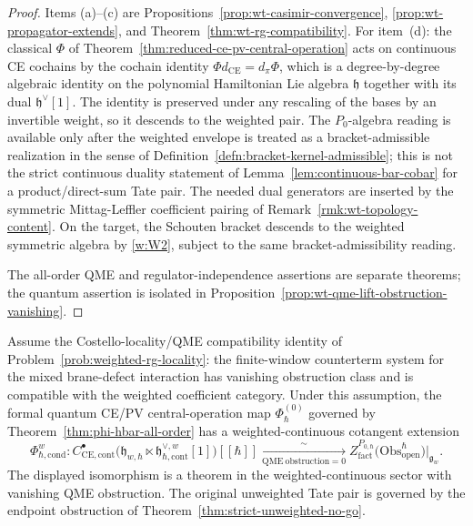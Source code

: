 \begin{proof}
  Items (a)--(c) are
  Propositions~\ref{prop:wt-casimir-convergence},
  \ref{prop:wt-propagator-extends}, and
  Theorem~\ref{thm:wt-rg-compatibility}. For item~(d): the
  classical $\Phi$ of Theorem~\ref{thm:reduced-ce-pv-central-operation}
  acts on continuous CE cochains by the cochain identity
  $\Phi d_{\mathrm{CE}}=d_\pi\Phi$, which is a degree-by-degree
  algebraic identity on the polynomial Hamiltonian Lie algebra
  $\mathfrak h$ together with its dual $\mathfrak h^\vee[1]$. The
  identity is preserved under any rescaling of the bases by an
  invertible weight, so it descends to the weighted pair. The
  \(P_0\)-algebra reading is available only after the weighted envelope is
  treated as a bracket-admissible realization in the sense of
  Definition~\ref{defn:bracket-kernel-admissible}; this is not the strict
  continuous duality statement of Lemma~\ref{lem:continuous-bar-cobar} for
  a product/direct-sum Tate pair.  The needed dual generators are inserted
  by the symmetric Mittag-Leffler coefficient pairing of
  Remark~\ref{rmk:wt-topology-content}. On the target, the Schouten bracket
  descends to the weighted symmetric algebra by \ref{w:W2}, subject to the
  same bracket-admissibility reading.

  The all-order QME and regulator-independence assertions are separate
  theorems; the quantum assertion is isolated in
  Proposition~\ref{prop:wt-qme-lift-obstruction-vanishing}.
\end{proof}

\begin{prop}\label{prop:wt-qme-lift-obstruction-vanishing}
  Assume the Costello-locality/QME compatibility identity of
  Problem~\ref{prob:weighted-rg-locality}: the finite-window
  counterterm system for the mixed brane-defect interaction has
  vanishing obstruction class and is compatible with the weighted
  coefficient category.  Under this assumption, the formal quantum
  CE/PV central-operation map $\Phi_\hbar^{(0)}$ governed by
  Theorem~\ref{thm:phi-hbar-all-order} has a weighted-continuous
  cotangent extension
  $$\Phi_{\hbar,\mathrm{cond}}^{w}\colon
    C^\bullet_{\mathrm{CE},\mathrm{cont}}\bigl(
    \mathfrak h_{w,\hbar}\ltimes
    \mathfrak h^{\vee,w}_{\hbar,\mathrm{cont}}[1]\bigr)[[\hbar]]
    \xrightarrow[\mathrm{QME\ obstruction}=0]{\sim}
    Z^{P_{0,\hbar}}_{\mathrm{fact}}\bigl(
    \mathrm{Obs}^\hbar_{\mathrm{open}}\bigr)|_{\mathfrak g_w}.$$
  The displayed isomorphism is a theorem in the weighted-continuous
  sector with vanishing QME obstruction.  The original unweighted Tate
  pair is governed by the endpoint obstruction of
  Theorem~\ref{thm:strict-unweighted-no-go}.
\end{prop}

